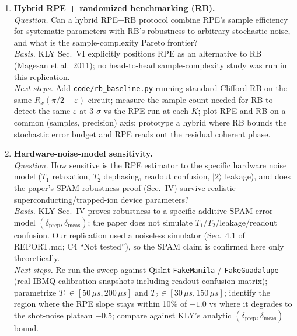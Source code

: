 \begin{enumerate}
\item \textbf{Hybrid RPE + randomized benchmarking (RB).}\\
  \emph{Question.} Can a hybrid RPE+RB protocol combine RPE's sample
  efficiency for systematic parameters with RB's robustness to
  arbitrary stochastic noise, and what is the sample-complexity Pareto
  frontier?\\
  \emph{Basis.} KLY Sec.~VI explicitly positions RPE as an alternative
  to RB (Magesan et al.~2011); no head-to-head sample-complexity study
  was run in this replication.\\
  \emph{Next steps.} Add \texttt{code/rb\_baseline.py} running standard
  Clifford RB on the same $R_x(\pi/2+\varepsilon)$ circuit; measure the
  sample count needed for RB to detect the same $\varepsilon$ at
  3-$\sigma$ vs the RPE run at each $K$; plot RPE and RB on a common
  (samples, precision) axis; prototype a hybrid where RB bounds the
  stochastic error budget and RPE reads out the residual coherent
  phase.

\item \textbf{Hardware-noise-model sensitivity.}\\
  \emph{Question.} How sensitive is the RPE estimator to the specific
  hardware noise model ($T_1$ relaxation, $T_2$ dephasing, readout
  confusion, $|2\rangle$ leakage), and does the paper's SPAM-robustness
  proof (Sec.~IV) survive realistic superconducting/trapped-ion device
  parameters?\\
  \emph{Basis.} KLY Sec.~IV proves robustness to a specific
  additive-SPAM error model $(\delta_{\text{prep}},\delta_{\text{meas}})$;
  the paper does not simulate $T_1/T_2$/leakage/readout confusion. Our
  replication used a noiseless simulator (Sec.~4.1 of REPORT.md; C4
  ``Not tested''), so the SPAM claim is confirmed here only
  theoretically.\\
  \emph{Next steps.} Re-run the sweep against Qiskit \texttt{FakeManila}
  / \texttt{FakeGuadalupe} (real IBMQ calibration snapshots including
  readout confusion matrix); parametrize
  $T_1 \in [50\,\mu s, 200\,\mu s]$ and
  $T_2 \in [30\,\mu s, 150\,\mu s]$; identify the region where the RPE
  slope stays within 10\% of $-1.0$ vs where it degrades to the
  shot-noise plateau $-0.5$; compare against KLY's analytic
  $(\delta_{\text{prep}},\delta_{\text{meas}})$ bound.


\end{enumerate}
